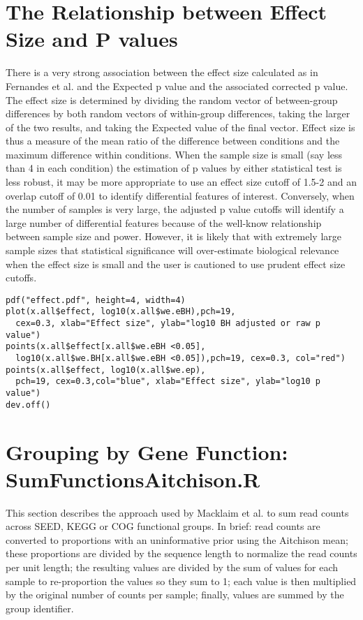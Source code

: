 \documentclass[11pt]{article}
\begin{document}
{\section{The Relationship between Effect Size and P values} There is a very strong association between the effect size calculated as in Fernandes et al.\cite{fernandes:2013} and the Expected p value and the associated corrected p value. The effect size is determined by dividing the random vector of between-group differences by both random vectors of within-group differences, taking the larger of the two results, and taking the Expected value of the final vector. Effect size is thus a measure of the mean ratio of the difference between conditions and the maximum difference within conditions. When the sample size is small (say less than 4 in each condition)  the estimation of p values by either statistical test is less robust, it may be more appropriate to use an effect size cutoff of 1.5-2 and an overlap cutoff of 0.01 to identify differential features of interest\cite{fernandes:2013}. Conversely, when the number of samples is very large, the adjusted p value cutoffs will identify a large number of differential features because of the well-know relationship between sample size and power. However, it is likely that with extremely large sample sizes that statistical significance will over-estimate biological relevance when the effect size is small and the user is cautioned to use prudent effect size cutoffs\cite{Nakagawa:2007}.\
\begin{verbatim}pdf("effect.pdf", height=4, width=4)
plot(x.all$effect, log10(x.all$we.eBH),pch=19, 
  cex=0.3, xlab="Effect size", ylab="log10 BH adjusted or raw p value")
points(x.all$effect[x.all$we.eBH <0.05], 
  log10(x.all$we.BH[x.all$we.eBH <0.05]),pch=19, cex=0.3, col="red")
points(x.all$effect, log10(x.all$we.ep), 
  pch=19, cex=0.3,col="blue", xlab="Effect size", ylab="log10 p value")
dev.off()
\end{verbatim}

\newpage

\section{Grouping by Gene Function: SumFunctionsAitchison.R}
This section describes the approach used by Macklaim et al.\cite{macklaim:2013} to sum read counts across SEED, KEGG or COG functional groups. In brief: read counts are converted to proportions with an uninformative prior using the Aitchison mean\cite{Aitchison:1986}; these proportions are divided by the sequence length to normalize the read counts per unit length; the resulting values are divided by the sum of values for each sample to re-proportion the values so they sum to 1; each value is then multiplied by the original number of counts per sample; finally, values are summed by the group identifier. 

}
\end{document}
